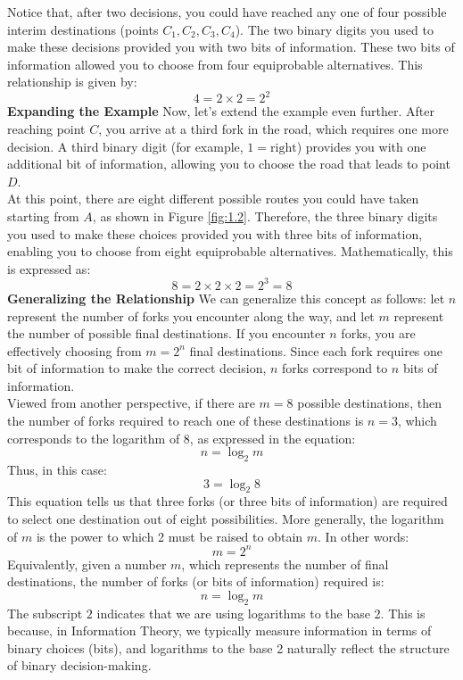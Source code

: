 \documentclass[12pt, oneside]{book}
\begin{document}
Notice that, after two decisions, you could have reached any one of four possible interim destinations (points \(C_1, C_2, C_3, C_4\)). The two binary digits you used to make these decisions provided you with two bits of information. These two bits of information allowed you to choose from four equiprobable alternatives. This relationship is given by:\\
\[4 = 2 \times 2 = 2^2\]
\textbf{Expanding the Example}
Now, let’s extend the example even further. After reaching point \(C\), you arrive at a third fork in the road, which requires one more decision. A third binary digit (for example, \(1 = \text{right}\)) provides you with one additional bit of information, allowing you to choose the road that leads to point \(D\). \\
At this point, there are eight different possible routes you could have taken starting from \(A\), as shown in Figure \ref{fig:1.2}. Therefore, the three binary digits you used to make these choices provided you with three bits of information, enabling you to choose from eight equiprobable alternatives. Mathematically, this is expressed as:
\[
8 = 2 \times 2 \times 2 = 2^3 = 8
\]
\textbf{Generalizing the Relationship}
We can generalize this concept as follows: let \(n\) represent the number of forks you encounter along the way, and let \(m\) represent the number of possible final destinations. If you encounter \(n\) forks, you are effectively choosing from \(m = 2^n\) final destinations. Since each fork requires one bit of information to make the correct decision, \(n\) forks correspond to \(n\) bits of information.\\
Viewed from another perspective, if there are \(m = 8\) possible destinations, then the number of forks required to reach one of these destinations is \(n = 3\), which corresponds to the logarithm of 8, as expressed in the equation:\\
\[n = \log_2 m\]
Thus, in this case:
\[3 = \log_2 8\]
This equation tells us that three forks (or three bits of information) are required to select one destination out of eight possibilities. More generally, the logarithm of \(m\) is the power to which 2 must be raised to obtain \(m\). In other words:
\[m = 2^n\]
Equivalently, given a number \(m\), which represents the number of final destinations, the number of forks (or bits of information) required is:
\[n = \log_2 m\]
The subscript \(2\) indicates that we are using logarithms to the base 2. This is because, in Information Theory, we typically measure information in terms of binary choices (bits), and logarithms to the base 2 naturally reflect the structure of binary decision-making.\\
\end{document}
